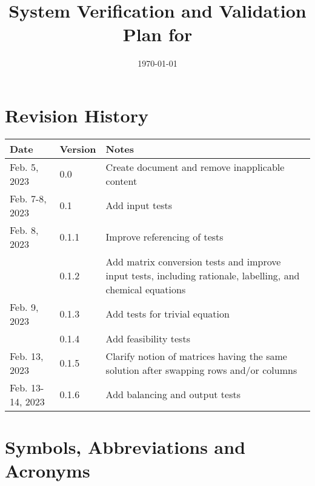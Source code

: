 \documentclass[12pt, titlepage]{article}
\begin{document}
\title{%
  System Verification and Validation Plan for \progname{}}
\author{\authname}
\date{\today}

\maketitle


\section{Revision History}

\begin{tabularx}{\textwidth}{llX}
  \toprule {\bf Date} & {\bf Version} & {\bf Notes}                       \\
  \midrule
  Feb. 5, 2023        & 0.0           & Create document and remove
  inapplicable content                                                    \\
  Feb. 7-8, 2023      & 0.1           & Add input tests                   \\
  Feb. 8, 2023        & 0.1.1         & Improve referencing of tests      \\
                      & 0.1.2         & Add matrix conversion tests and
  improve input tests, including rationale, labelling, and chemical
  equations                                                               \\
  Feb. 9, 2023        & 0.1.3         & Add tests for trivial equation    \\
                      & 0.1.4         & Add feasibility tests             \\
  Feb. 13, 2023       & 0.1.5         & Clarify notion of matrices having
  the same solution after swapping rows and/or columns                    \\
  Feb. 13-14, 2023    & 0.1.6         & Add balancing and output tests    \\
  \bottomrule
\end{tabularx}

\newpage

\tableofcontents

\listoftables
{}

\listoffigures
{}

\newpage

\section{Symbols, Abbreviations and Acronyms}
\end{document}
